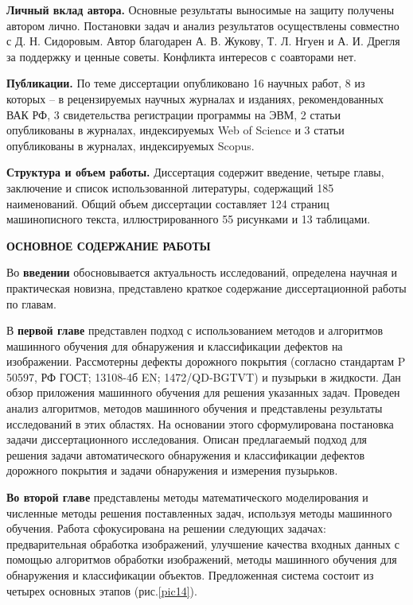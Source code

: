 \textbf{Личный вклад автора.} Основные результаты выносимые на защиту получены автором лично. Постановки задач и анализ результатов осуществлены совместно с Д. Н. Сидоровым. Автор благодарен А. В. Жукову, Т. Л. Нгуен и А. И. Дрегля за поддержку и ценные советы. Конфликта интересов с соавторами нет.

\textbf{Публикации.} По теме диссертации опубликовано 16 научных работ, 8 из которых – в рецензируемых научных журналах и изданиях, рекомендованных ВАК РФ, 3 свидетельства регистрации программы на ЭВМ, 2 статьи опубликованы в журналах, индексируемых Web of Science и 3 статьи опубликованы в журналах, индексируемых Scopus.

\textbf{Структура и объем работы.} Диссертация содержит введение, четыре главы, заключение и список использованной литературы, содержащий 185 наименований. Общий объем диссертации составляет 124 страниц машинописного текста, иллюстрированного 55 рисунками и 13 таблицами.
\begin{center}
\textbf{ОСНОВНОЕ СОДЕРЖАНИЕ РАБОТЫ}
\end{center}

Во {\textbf{введении}} обосновывается актуальность исследований, определена научная и практическая новизна, представлено краткое содержание диссертационной работы по главам.

В \textbf {первой главе} представлен подход с использованием методов и алгоритмов машинного обучения для обнаружения и классификации дефектов на изображении. Рассмотерны дефекты дорожного покрытия (согласно стандартам P 50597, РФ ГОСТ; 13108-4б EN; 1472/QD-BGTVT) и пузырьки в жидкости. Дан обзор приложения машинного обучения для решения указанных задач. Проведен анализ алгоритмов, методов машинного обучения и представлены результаты исследований в этих областях. На основании этого сформулирована постановка задачи диссертационного исследования. Описан предлагаемый подход для решения задачи автоматического обнаружения и классификации дефектов дорожного покрытия и задачи обнаружения и измерения пузырьков.

 \textbf{Во второй главе} представлены методы математического моделирования и численные методы решения поставленных задач, используя методы машинного обучения. Работа сфокусирована на решении следующих задачах: предварительная обработка изображений, улучшение качества входных данных с помощью алгоритмов обработки изображений, методы машинного обучения для обнаружения и классификации объектов. Предложенная система состоит из четырех основных этапов (рис.\ref{pic14}).

